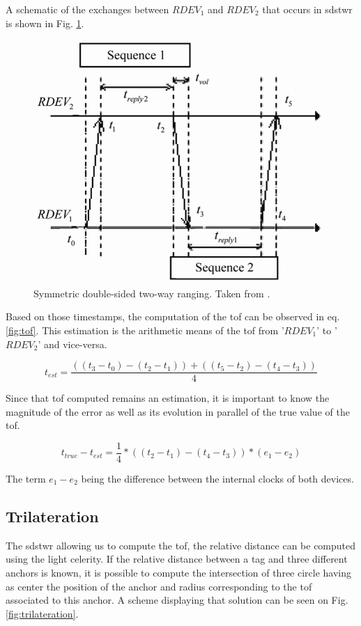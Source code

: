 A schematic of the exchanges between $RDEV_1$ and $RDEV_2$ that occurs in \gls{sdstwr} is shown in Fig. \ref{sdstwr}. 

\begin{figure}[H]
\centering
\includegraphics[width=.6\linewidth]{Images/sds-twr.png}
\caption{Symmetric double-sided two-way ranging. Taken from \cite{dalce2011comparison}.}
\label{sdstwr}
\end{figure}

Based on those timestamps, the computation of the \gls{tof} can be observed in eq. \ref{fig:tof}. This estimation is the arithmetic means of the \gls{tof} from '$RDEV_1$' to '$RDEV_2$' and vice-versa.

\begin{equation}
	t_{est} = \frac{((t_3 - t_0) - (t_2 - t_1)) + ((t_5 - t_2) - (t_4 - t_3))}{4}
\label{fig:tof}
\end{equation}

Since that \gls{tof} computed remains an estimation, it is important to know the magnitude of the error as well as its evolution in parallel of the true value of the \gls{tof}.

\begin{equation}
	t_{true} - t_{est} = \frac{1}{4}*((t_2 - t_1) - (t_4 - t_3))*(e_1 - e_2)
\end{equation}

The term $e_1 - e_2$ being the difference between the internal clocks of both devices. \cite{dalce2011comparison}


\subsection{Trilateration}
\label{tril}

The \gls{sdstwr} allowing us to compute the \gls{tof}, the relative distance can be computed using the light celerity. If the relative distance between a tag and three different anchors is known, it is possible to compute the intersection of three circle having as center the position of the anchor and radius corresponding to the \gls{tof} associated to this anchor. A scheme displaying that solution can be seen on Fig. \ref{fig:trilateration}.

